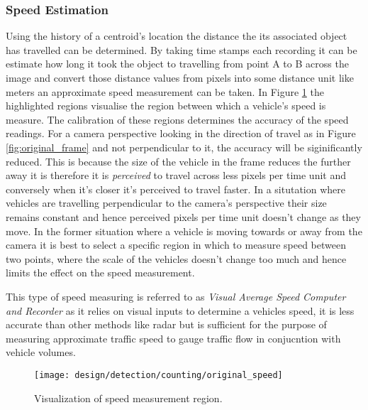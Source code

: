 \subsubsection{Speed Estimation}

Using the history of a centroid's location the distance the its associated object has travelled can be determined. By taking time stamps each recording it can be estimate how long it took the object to travelling from point A to B across the image and convert those distance values from pixels into some distance unit like meters an approximate speed measurement can be taken. In Figure \ref{fig:speed} the highlighted regions visualise the region between which a vehicle's speed is measure. The calibration of these regions determines the accuracy of the speed readings. For a camera perspective looking in the direction of travel as in Figure \ref{fig:original_frame} and not perpendicular to it, the accuracy will be siginificantly reduced. This is because the size of the vehicle in the frame reduces the further away it is therefore it is \emph{perceived} to travel across less pixels per time unit and conversely when it's closer it's perceived to travel faster. In a situtation where vehicles are travelling perpendicular to the camera's perspective their size remains constant and hence perceived pixels per time unit doesn't change as they move. In the former situation where a vehicle is moving towards or away from the camera it is best to select a specific region in which to measure speed between two points, where the scale of the vehicles doesn't change too much and hence limits the effect on the speed measurement. 

This type of speed measuring is referred to as \emph{Visual Average Speed Computer and Recorder} as it relies on visual inputs to determine a vehicles speed, it is less accurate than other methods like radar but is sufficient for the purpose of measuring approximate traffic speed to gauge traffic flow in conjucntion with vehicle volumes.

\begin{figure}[H]
	\centering
	\centering\texttt{[image: design/detection/counting/original\_speed]}
	\caption{Visualization of speed measurement region.}
	\label{fig:speed}
  \end{figure} 


  